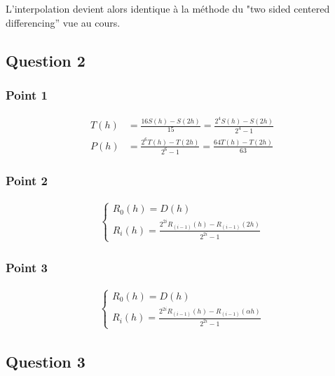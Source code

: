 L'interpolation devient alors identique à la méthode du "two sided centered differencing'' vue au cours.

\subsection{Question 2}

\subsubsection{Point 1}

\begin{equation}
	\begin{aligned}
		T(h) &= \frac{16S(h)-S(2h)}{15} = \frac{2^4S(h)-S(2h)}{2^4-1}\\
		P(h) &= \frac{2^6T(h)-T(2h)}{2^6-1} = \frac{64T(h)-T(2h)}{63}
	\end{aligned}
\end{equation}

\subsubsection{Point 2}

\begin{equation}
	\begin{aligned}
		\begin{cases} 
			R_0(h) = D(h)\\
			R_i(h) = \frac{2^{2i}R_{(i-1)}(h) - R_{(i-1)}(2h)}{2^{2i}-1}
		\end{cases}
	\end{aligned}
\end{equation}

\subsubsection{Point 3}

\begin{equation}
	\begin{aligned}
		\begin{cases} 
			R_0(h) = D(h)\\
			R_i(h) = \frac{2^{2i}R_{(i-1)}(h) - R_{(i-1)}(\alpha h)}{2^{2i}-1}
		\end{cases}
	\end{aligned}
\end{equation}

\subsection{Question 3}

